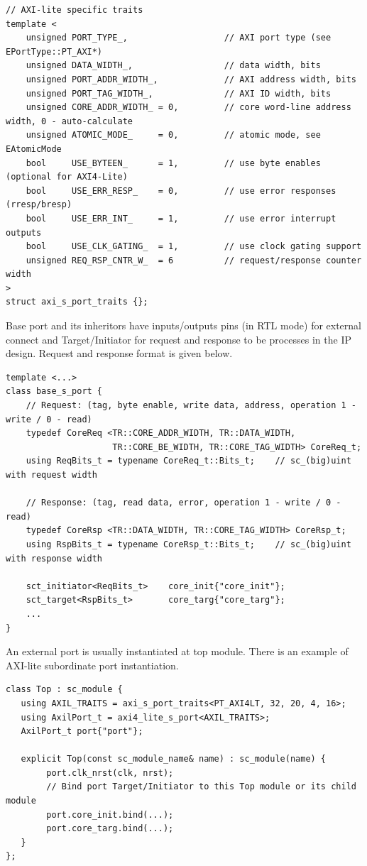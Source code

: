 \begin{lstlisting}[style=mycpp]
// AXI-lite specific traits
template <
    unsigned PORT_TYPE_,                   // AXI port type (see EPortType::PT_AXI*)
    unsigned DATA_WIDTH_,                  // data width, bits
    unsigned PORT_ADDR_WIDTH_,             // AXI address width, bits
    unsigned PORT_TAG_WIDTH_,              // AXI ID width, bits
    unsigned CORE_ADDR_WIDTH_ = 0,         // core word-line address width, 0 - auto-calculate
    unsigned ATOMIC_MODE_     = 0,         // atomic mode, see EAtomicMode
    bool     USE_BYTEEN_      = 1,         // use byte enables (optional for AXI4-Lite)
    bool     USE_ERR_RESP_    = 0,         // use error responses (rresp/bresp)
    bool     USE_ERR_INT_     = 1,         // use error interrupt outputs
    bool     USE_CLK_GATING_  = 1,         // use clock gating support
    unsigned REQ_RSP_CNTR_W_  = 6          // request/response counter width
>
struct axi_s_port_traits {};
\end{lstlisting}

Base port and its inheritors have inputs/outputs pins (in RTL mode) for external connect and Target/Initiator for request and response to be processes in the IP design. Request and response format is given below.

\begin{lstlisting}[style=mycpp]
template <...>
class base_s_port {
    // Request: (tag, byte enable, write data, address, operation 1 - write / 0 - read)
    typedef CoreReq <TR::CORE_ADDR_WIDTH, TR::DATA_WIDTH, 
                     TR::CORE_BE_WIDTH, TR::CORE_TAG_WIDTH> CoreReq_t;
    using ReqBits_t = typename CoreReq_t::Bits_t;    // sc_(big)uint with request width

    // Response: (tag, read data, error, operation 1 - write / 0 - read)
    typedef CoreRsp <TR::DATA_WIDTH, TR::CORE_TAG_WIDTH> CoreRsp_t;
    using RspBits_t = typename CoreRsp_t::Bits_t;    // sc_(big)uint with response width

    sct_initiator<ReqBits_t>    core_init{"core_init"};
    sct_target<RspBits_t>       core_targ{"core_targ"};
    ...
}
\end{lstlisting}

An external port is usually instantiated at top module. There is an example of AXI-lite subordinate port instantiation.

\begin{lstlisting}[style=mycpp]
class Top : sc_module {
   using AXIL_TRAITS = axi_s_port_traits<PT_AXI4LT, 32, 20, 4, 16>;
   using AxilPort_t = axi4_lite_s_port<AXIL_TRAITS>;
   AxilPort_t port{"port"};

   explicit Top(const sc_module_name& name) : sc_module(name) {
        port.clk_nrst(clk, nrst);
        // Bind port Target/Initiator to this Top module or its child module
        port.core_init.bind(...);  
        port.core_targ.bind(...);
   }
};
\end{lstlisting}
\fi



